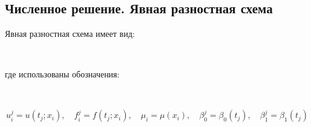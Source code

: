 \documentclass[14pt,a4paper]{scrartcl}
\begin{document}
\pagebreak
\subsection*{Численное решение. Явная разностная схема}

Явная разностная схема имеет вид:

\begin{figure}[H]
	\begin{minipage}[h]{1\linewidth}
		\\
	\end{minipage}
\end{figure}

где использованы обозначения:

\begin{figure}[H]
	\begin{minipage}[h]{1\linewidth}
		\\
	\end{minipage}
\end{figure}


\begin{equation*}
	u_i^j = u(t_j;x_i), \quad f_i^j = f(t_j;x_i), \quad \mu_i=\mu(x_i), \quad \beta_0^j = \beta_0(t_j), \quad \beta_1^j=\beta_1(t_j)
\end{equation*}
\end{document}
